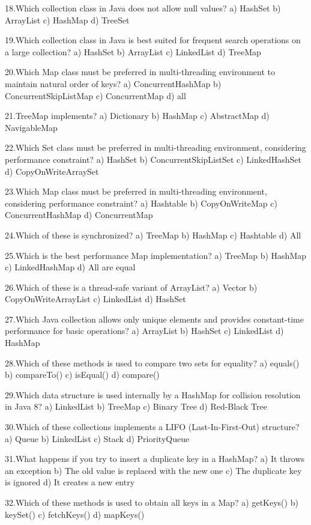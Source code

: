 {18.Which collection class in Java does not allow null values?
a) HashSet
b) ArrayList
c) HashMap
d) TreeSet

19.Which collection class in Java is best suited for frequent search operations on a large collection?
a) HashSet
b) ArrayList
c) LinkedList
d) TreeMap

20.Which Map class must be preferred in multi-threading environment to maintain natural order of keys?
a) ConcurrentHashMap
b) ConcurrentSkipListMap
c) ConcurrentMap
d) all

21.TreeMap implements?
a) Dictionary
b) HashMap
c) AbstractMap
d) NavigableMap

22.Which Set class must be preferred in multi-threading environment, considering performance constraint?
a) HashSet
b) ConcurrentSkipListSet
c) LinkedHashSet
d) CopyOnWriteArraySet

23.Which Map class must be preferred in multi-threading environment, considering performance constraint?
a) Hashtable
b) CopyOnWriteMap
c) ConcurrentHashMap
d) ConcurrentMap

24.Which of these is synchronized?
a) TreeMap
b) HashMap
c) Hashtable
d) All

25.Which is the best performance Map implementation?
a) TreeMap
b) HashMap
c) LinkedHashMap
d) All are equal

26.Which of these is a thread-safe variant of ArrayList?
a) Vector
b) CopyOnWriteArrayList
c) LinkedList
d) HashSet

27.Which Java collection allows only unique elements and provides constant-time performance for basic operations?
a) ArrayList
b) HashSet
c) LinkedList
d) HashMap

28.Which of these methods is used to compare two sets for equality?
a) equals()
b) compareTo()
c) isEqual()
d) compare()

29.Which data structure is used internally by a HashMap for collision resolution in Java 8?
a) LinkedList
b) TreeMap
c) Binary Tree
d) Red-Black Tree

30.Which of these collections implements a LIFO (Last-In-First-Out) structure?
a) Queue
b) LinkedList
c) Stack
d) PriorityQueue

31.What happens if you try to insert a duplicate key in a HashMap?
a) It throws an exception
b) The old value is replaced with the new one
c) The duplicate key is ignored
d) It creates a new entry

32.Which of these methods is used to obtain all keys in a Map?
a) getKeys()
b) keySet()
c) fetchKeys()
d) mapKeys()

}
